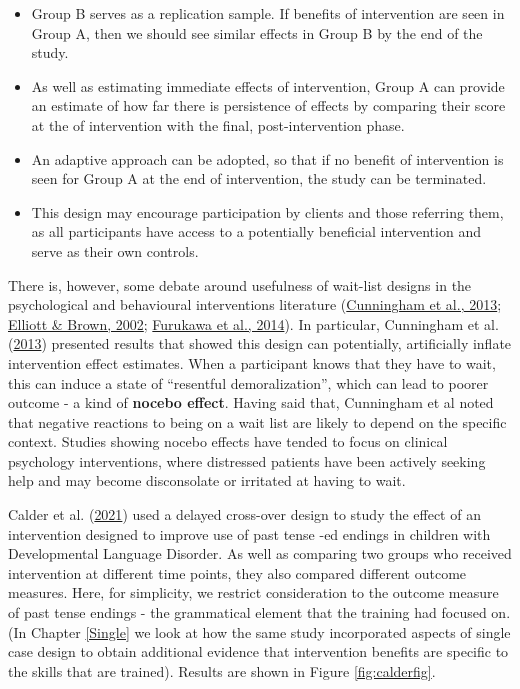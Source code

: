 \documentclass{krantz}
\providecommand{\tightlist}{%
\setlength{\itemsep}{0pt}\setlength{\parskip}{0pt}}
\begin{document}
\begin{itemize}
\tightlist
\item
  Group B serves as a replication sample. If benefits of intervention are seen in Group A, then we should see similar effects in Group B by the end of the study.\\
\item
  As well as estimating immediate effects of intervention, Group A can provide an estimate of how far there is persistence of effects by comparing their score at the of intervention with the final, post-intervention phase.\\
\item
  An adaptive approach can be adopted, so that if no benefit of intervention is seen for Group A at the end of intervention, the study can be terminated.\\
\item
  This design may encourage participation by clients and those referring them, as all participants have access to a potentially beneficial intervention and serve as their own controls.
\end{itemize}

There is, however, some debate around usefulness of wait-list designs in the psychological and behavioural interventions literature (\protect\hyperlink{ref-cunningham2013}{Cunningham et al., 2013}; \protect\hyperlink{ref-elliott2002}{Elliott \& Brown, 2002}; \protect\hyperlink{ref-furukawa2014}{Furukawa et al., 2014}). In particular, Cunningham et al. (\protect\hyperlink{ref-cunningham2013}{2013}) presented results that showed this design can potentially, artificially inflate intervention effect estimates. When a participant knows that they have to wait, this can induce a state of ``resentful demoralization'', which can lead to poorer outcome - a kind of \textbf{nocebo effect}. Having said that, Cunningham et al noted that negative reactions to being on a wait list are likely to depend on the specific context. Studies showing nocebo effects have tended to focus on clinical psychology interventions, where distressed patients have been actively seeking help and may become disconsolate or irritated at having to wait.

Calder et al. (\protect\hyperlink{ref-calder2021}{2021}) used a delayed cross-over design to study the effect of an intervention designed to improve use of past tense -ed endings in children with Developmental Language Disorder. As well as comparing two groups who received intervention at different time points, they also compared different outcome measures. Here, for simplicity, we restrict consideration to the outcome measure of past tense endings - the grammatical element that the training had focused on. (In Chapter \ref{Single} we look at how the same study incorporated aspects of single case design to obtain additional evidence that intervention benefits are specific to the skills that are trained). Results are shown in Figure \ref{fig:calderfig}.
\end{document}

